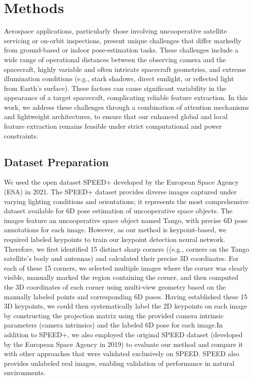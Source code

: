 \documentclass[a4paper,fleqn]{cas-sc}
\begin{document}
\section{Methods}\label{sec:method}
Aerospace applications, particularly those involving uncooperative satellite servicing or on-orbit inspections, present unique challenges that differ markedly from ground-based or indoor pose-estimation tasks. These challenges include a wide range of operational distances between the observing camera and the spacecraft, highly variable and often intricate spacecraft geometries, and extreme illumination conditions (e.g., stark shadows, direct sunlight, or reflected light from Earth's surface). These factors can cause significant variability in the appearance of a target spacecraft, complicating reliable feature extraction. In this work, we address these challenges through a combination of attention mechanisms and lightweight architectures, to ensure that our enhanced global and local feature extraction remains feasible under strict computational and power constraints.

\subsection{Dataset Preparation}
We used the open dataset SPEED+ \citep{speed+} developed by the European Space Agency (ESA) in 2021. The SPEED+ dataset provides diverse images captured under varying lighting conditions and orientations; it represents the most comprehensive dataset available for 6D pose estimation of uncooperative space objects. The images feature an uncooperative space object named Tango, with precise 6D pose annotations for each image. However, as our method is keypoint-based, we required labeled keypoints to train our keypoint detection neural network. Therefore, we first identified 15 distinct sharp corners ((e.g., corners on the Tango satellite’s body and antennas) and calculated their precise 3D coordinates. For each of these 15 corners, we selected multiple images where the corner was clearly visible, manually marked the region containing the corner, and then computed the 3D coordinates of each corner using multi-view geometry based on the manually labeled points and corresponding 6D poses. Having established these 15 3D keypoints, we could then systematically label the 2D keypoints on each image by constructing the projection matrix using the provided camera intrinsic parameters (camera intrinsics) and the labeled 6D pose for each image.In addition to SPEED+, we also employed the original SPEED dataset (developed by the European Space Agency in 2019) to evaluate our method and compare it with other approaches that were validated exclusively on SPEED. SPEED also provides unlabeled real images, enabling validation of performance in natural environments.
\end{document}
